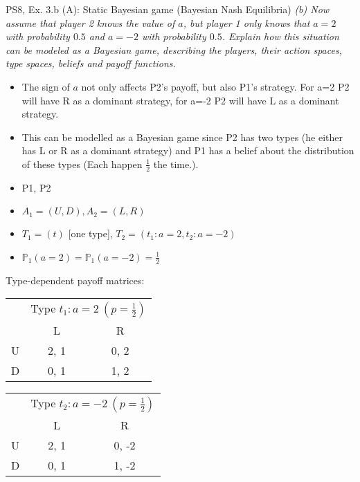 \begin{frame}{PS8, Ex. 3.b (A): Static Bayesian game (Bayesian Nash Equilibria)}
    \textit{(b) Now assume that player 2 knows the value of $a$, but player 1 only knows that $a = 2$ with probability $0.5$ and $a = −2$ with probability $0.5$. Explain how this situation can be modeled as a Bayesian game, describing the players, their action spaces, type spaces, beliefs and payoff functions.}
    \vspace{-8pt}
  \begin{multicols}{2}
    \begin{itemize}
    \item[(a)] The sign of $a$ not only affects P2's payoff, but also P1's strategy. For a=2 P2 will have R as a dominant strategy, for a=-2 P2 will have L as a dominant strategy.
    \item[(b)] This can be modelled as a Bayesian game since P2 has two types (he either has L or R as a dominant strategy) and P1 has a belief about the distribution of these types (Each happen $\frac{1}{2}$ the time.). 
        \item[Players:] P1, P2
        \item[Action sp.:] $A_1=(U,D),A_2=(L,R)$
        \item[Type space:] $T_1=(t)$ [one type], $T_2=(t_1:a=2,t_2:a=-2)$
        \item[Beliefs:] $\mathbb{P}_1(a=2)=\mathbb{P}_1(a=-2)=\frac{1}{2}$
        \vfill\null\columnbreak
    \end{itemize}
    Type-dependent payoff matrices:
    \vspace{-8pt}
    \begin{table}
        \begin{tabular}{l|c|c|}
        \multicolumn{1}{c}{} & \multicolumn{2}{c}{Type $t_1:a=2\ (p=\frac{1}{2})$} \\
        \multicolumn{1}{c}{} & \multicolumn{1}{c}{L} & \multicolumn{1}{c}{R} \\\cline{2-3}
        U & 2, 1 & 0, 2 \\\cline{2-3}
        D & 0, 1 & 1, 2 \\\cline{2-3}
      \end{tabular}
    \end{table}
    \vspace{-8pt}
    \begin{table}
      \begin{tabular}{l|c|c|}
        \multicolumn{1}{c}{} & \multicolumn{2}{c}{Type $t_2:a=-2\ (p=\frac{1}{2})$} \\
        \multicolumn{1}{c}{} & \multicolumn{1}{c}{L} & \multicolumn{1}{c}{R} \\\cline{2-3}
        U & 2, 1 & 0, -2 \\\cline{2-3}
        D & 0, 1 & 1, -2 \\\cline{2-3}
      \end{tabular}
    \end{table}
    \vfill\null
  \end{multicols}
\end{frame}



